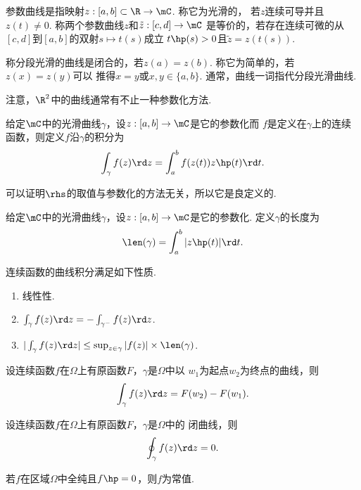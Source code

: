   \begin{defi}[参数曲线]
    参数曲线是指映射$z:[a,b]\subset\R\to\mC$. 称它为光滑的，
    若$z$连续可导并且$z(t)\ne 0$. 称两个参数曲线$z$和$\tilde{z}:[c,d]\to\mC$
    是等价的，若存在连续可微的从$[c,d]$到$[a,b]$的双射$s\mapsto t(s)$成立
    $t\hp(s)>0$且$\tilde{z}=z(t(s))$.\par
    称分段光滑的曲线是闭合的，若$z(a)=z(b)$. 称它为简单的，若$z(x)=z(y)$可以
    推得$x=y$或$x,y\in\{a, b\}$. 通常，曲线一词指代分段光滑曲线.
  \end{defi}
  \remark
    注意，$\R^2$中的曲线通常有不止一种参数化方法.

  \begin{defi}[曲线积分]
    给定$\mC$中的光滑曲线$\gamma$，设$z:[a,b]\to\mC$是它的参数化而
    $f$是定义在$\gamma$上的连续函数，则定义$f$沿$\gamma$的积分为
    \[
      \int_\gamma f(z)\rd z = \int_a^b f(z(t))z\hp(t)\rd t.
    \]
  \end{defi}
  \remark
    可以证明$\rhs$的取值与参数化的方法无关，所以它是良定义的.

  \begin{defi}[曲线长度]
    给定$\mC$中的光滑曲线$\gamma$，设$z:[a,b]\to\mC$是它的参数化.
    定义$\gamma$的长度为
    \[
      \len(\gamma) = \int_a^b|z\hp(t)|\rd t.
    \]
  \end{defi}

  \begin{thm}
    连续函数的曲线积分满足如下性质.
    \begin{enumerate}
      \item 线性性.
      \item $\int_\gamma f(z)\rd z = -\int_{\gamma^-}f(z)\rd z$.
      \item $|\int_\gamma f(z)\rd z| \le \sup_{z\in\gamma}|f(z)|\times\len(\gamma)$.
    \end{enumerate}
  \end{thm}

  \begin{thm}
    设连续函数$f$在$\Omega$上有原函数$F$，$\gamma$是$\Omega$中以
    $w_1$为起点$w_2$为终点的曲线，则
    \[
      \int_\gamma f(z)\rd z = F(w_2) - F(w_1).
    \]
  \end{thm}

  \begin{cor}
    \label{cor: 曲线积分1}
    设连续函数$f$在$\Omega$上有原函数$F$，$\gamma$是$\Omega$中的
    闭曲线，则
    \[
      \oint_\gamma f(z)\rd z = 0.
    \]
  \end{cor}

  \begin{cor}
    若$f$在区域$\Omega$中全纯且$f\hp = 0$，则$f$为常值.
  \end{cor}
